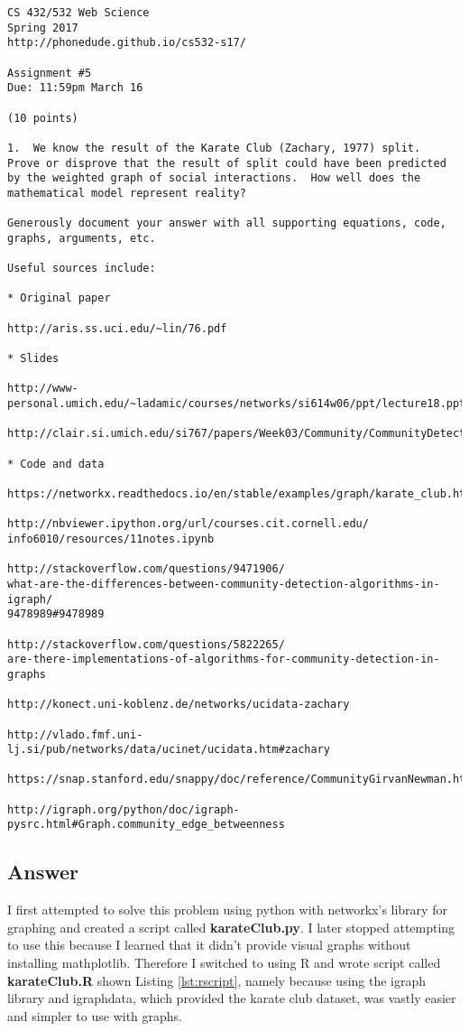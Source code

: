 \documentclass[letterpaper,11pt]{article}
\begin{document}
\begin{verbatim}
CS 432/532 Web Science
Spring 2017
http://phonedude.github.io/cs532-s17/

Assignment #5
Due: 11:59pm March 16

(10 points)

1.  We know the result of the Karate Club (Zachary, 1977) split.
Prove or disprove that the result of split could have been predicted
by the weighted graph of social interactions.  How well does the
mathematical model represent reality?

Generously document your answer with all supporting equations, code,
graphs, arguments, etc.

Useful sources include:

* Original paper

http://aris.ss.uci.edu/~lin/76.pdf

* Slides

http://www-personal.umich.edu/~ladamic/courses/networks/si614w06/ppt/lecture18.ppt

http://clair.si.umich.edu/si767/papers/Week03/Community/CommunityDetection.pptx

* Code and data

https://networkx.readthedocs.io/en/stable/examples/graph/karate_club.html

http://nbviewer.ipython.org/url/courses.cit.cornell.edu/
info6010/resources/11notes.ipynb

http://stackoverflow.com/questions/9471906/
what-are-the-differences-between-community-detection-algorithms-in-igraph/
9478989#9478989

http://stackoverflow.com/questions/5822265/
are-there-implementations-of-algorithms-for-community-detection-in-graphs

http://konect.uni-koblenz.de/networks/ucidata-zachary

http://vlado.fmf.uni-lj.si/pub/networks/data/ucinet/ucidata.htm#zachary

https://snap.stanford.edu/snappy/doc/reference/CommunityGirvanNewman.html

http://igraph.org/python/doc/igraph-pysrc.html#Graph.community_edge_betweenness
\end{verbatim}

\clearpage
\subsection*{Answer}

I first attempted to solve this problem using python with networkx's library for graphing and created a script called \textbf{karateClub.py}. I later stopped attempting to use this because I learned that it didn't provide visual graphs without installing mathplotlib. Therefore I switched to using R and wrote script called \textbf{karateClub.R} shown Listing \ref{lst:rscript}, namely because using the igraph library and igraphdata, which provided the karate club dataset, was vastly easier and simpler to use with graphs.
\end{document}
